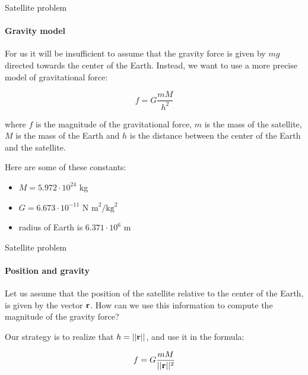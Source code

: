 \documentclass{beamer}
\begin{document}
\begin{frame}{Satellite problem}
\framesubtitle{Gravity model}
	\begin{flushleft}
		
		For us it will be insufficient to assume that the gravity force is given by $mg$ directed towards the center of the Earth. Instead, we want to use a more precise model of gravitational force:
		
		\begin{equation}
			f = G \frac{m M}{h^2}
		\end{equation}
	
		where $f$ is the magnitude of the gravitational force, $m$ is the mass of the satellite, $M$ is the mass of the Earth and $h$ is the distance between the center of the Earth and the satellite.
	
		\bigskip
	
		Here are some of these constants:		
		\begin{itemize}
			\item $M = 5.972 \cdot 10^{24}$ kg
			\item $G = 6.673 \cdot 10^{-11}$ $\text{N m}^2/\text{kg}^2$
			\item radius of Earth is $6.371 \cdot 10^{6}$ m
		\end{itemize}
		
	\end{flushleft}
\end{frame}



\begin{frame}{Satellite problem}
 \framesubtitle{Position and gravity}
	\begin{flushleft}
		
		Let us assume that the position of the satellite relative to the center of the Earth, is given by the vector $\mathbf{r}$. How can we use this information to compute the magnitude of the gravity force?
		
		\bigskip
		
		Our strategy is to realize that $h = ||\mathbf{r}||$, and use it in the formula:
		
		\begin{equation}
			f = G \frac{m M}{||\mathbf{r}||^2}
		\end{equation}		 
		
	\end{flushleft}
\end{frame}
\end{document}
